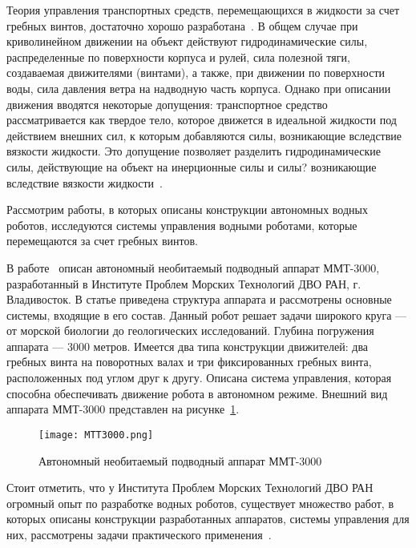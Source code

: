 Теория управления транспортных средств, перемещающихся в жидкости за счет гребных винтов, достаточно хорошо разработана~\cite{Ageev, Fossen, Fossen2, Basin_Anfimov_1961, Lebedev_Pershits_1969}. В общем случае при криволинейном движении на объект действуют гидродинамические силы, распределенные по поверхности корпуса и рулей, сила полезной тяги, создаваемая движителями (винтами), а также, при движении по поверхности воды, сила давления ветра на надводную часть корпуса. Однако при описании движения вводятся некоторые допущения: транспортное средство рассматривается как твердое тело, которое движется в идеальной жидкости под действием внешних сил, к которым добавляются силы, возникающие вследствие вязкости жидкости. Это допущение позволяет разделить гидродинамические силы, действующие на объект на инерционные силы и силы? возникающие вследствие вязкости жидкости~\cite{Basin_Anfimov_1961}.

Рассмотрим работы, в которых описаны конструкции автономных водных роботов, исследуются системы управления водными роботами, которые перемещаются за счет гребных винтов.

В работе~\cite{Gornak_MMT3000} описан автономный необитаемый подводный аппарат ММТ-3000, разработанный в Институте Проблем Морских Технологий ДВО РАН, г. Владивосток. В статье приведена структура аппарата и рассмотрены основные системы, входящие в его состав. Данный робот решает задачи широкого круга --- от морской биологии до геологических исследований. Глубина погружения аппарата --- 3000 метров. Имеется два типа конструкции движителей: два гребных винта на поворотных валах и три фиксированных гребных винта, расположенных под углом друг к другу. Описана система управления, которая способна обеспечивать движение робота в автономном режиме. Внешний вид аппарата ММТ-3000 представлен на рисунке~\ref{MTT3000}. 

\begin{figure}[h]
	\centering
	\texttt{[image: MTT3000.png]}%
	\caption{Автономный необитаемый подводный аппарат ММТ-3000}
	\label{MTT3000}
\end{figure}

Стоит отметить, что у Института Проблем Морских Технологий ДВО РАН огромный опыт по разработке водных роботов, существует множество работ, в которых описаны конструкции разработанных аппаратов, системы управления для них, рассмотрены задачи практического применения~\cite{Inzarcev_2018_book, Matvienko_2017, Naumov_2011, Boreyko_2011, Iznarcev_2007, Vaulin_2017, Inzarcev_2016}.


